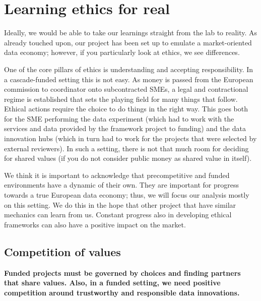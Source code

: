 
\section{Learning ethics for real}\label{learning-ethics-for-real}

Ideally, we would be able to take our learnings straight from the lab to
reality. As already touched upon, our project has been set up to emulate
a market-oriented data economy; however, if you particularly look at
ethics, we see  differences.

One of the core pillars of ethics is understanding and accepting
responsibility. In a cascade-funded setting this is not easy. As money
is passed from the European commission to coordinator onto subcontracted
SMEs, a legal and contractional regime is established that sets the
playing field for many things that follow. Ethical actions require the
choice to do things in the right way. This goes both for the SME
performing the data experiment (which had to work with the services and
data provided by the framework project to funding) and the data
innovation hubs (which in turn had to work for the projects that were
selected by external reviewers). In such a setting, there is not that
much room for deciding for shared values (if you do not consider public
money as shared value in itself).

We think it is important to acknowledge that precompetitive and funded
environments have a dynamic of their own. They are important for
progress towards a true European data economy; thus, we will focus our
analysis mostly on this setting. We do this in the hope that other
project that have similar mechanics can learn from us. Constant progress
also in developing ethical frameworks can also have a positive impact on
the market.

\subsection{Competition of values}\label{competition-of-values}

\textbf{Funded projects must be governed by choices and finding partners
that share values. Also, in a funded setting, we need positive
competition around trustworthy and responsible data innovations.}

